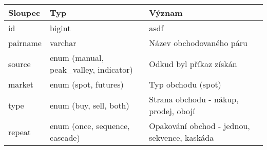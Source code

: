 
\begin{center}
    \begin{longtable}[h]{|l|C{4cm}|p{4cm}|}
        \hline
        Sloupec                               & Typ                                                                                                                                                              & Význam                                                                                                                            \\
        \hline
        id                                    & bigint                                                                                                                                                           & asdf                                                                                                                              \\
        pairname                              & varchar                                                                                                                                                          & Název obchodovaného páru                                                                                                          \\
        source                                & enum (manual, peak\_valley, indicator)                                                                                                                           & Odkud byl příkaz získán                                                                                                           \\
        market                                & enum (spot, futures)                                                                                                                                             & Typ obchodu (spot)                                                                                                                \\
        type                                  & enum (buy, sell, both)                                                                                                                                           & Strana obchodu - nákup, prodej, obojí                                                                                             \\
        repeat                                & enum (once, sequence, cascade)                                                                                                                                   & Opakování obchod - jednou, sekvence, kaskáda                                                                                      \\

\end{longtable}
\end{center}
